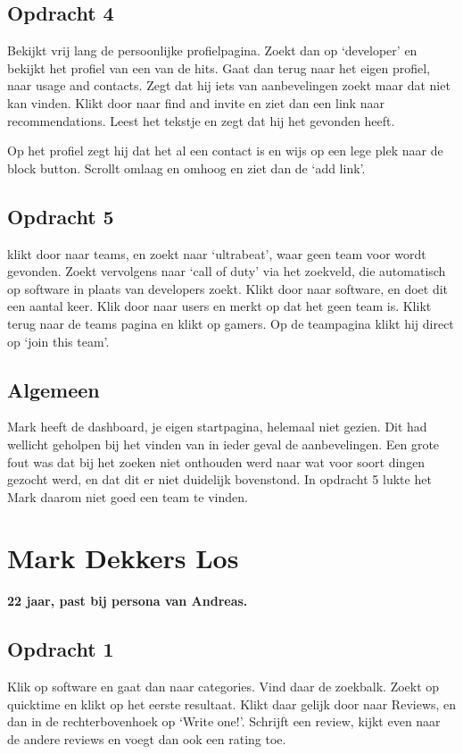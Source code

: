 \subsection{Opdracht 4}
Bekijkt vrij lang de persoonlijke profielpagina. Zoekt dan op `developer' en bekijkt het profiel van een van de hits. Gaat dan terug naar het eigen profiel, naar usage and contacts. Zegt dat hij iets van aanbevelingen zoekt maar dat niet kan vinden. Klikt door naar find and invite en ziet dan een link naar recommendations. Leest het tekstje en zegt dat hij het gevonden heeft.

Op het profiel zegt hij dat het al een contact is en wijs op een lege plek naar de block button. Scrollt omlaag en omhoog en ziet dan de `add link'.

\subsection{Opdracht 5}
klikt door naar teams, en zoekt naar `ultrabeat', waar geen team voor wordt gevonden. Zoekt vervolgens naar `call of duty' via het zoekveld, die automatisch op software in plaats van developers zoekt. Klikt door naar software, en doet dit een aantal keer. Klik door naar users en merkt op dat het geen team is. Klikt terug naar de teams pagina en klikt op gamers. Op de teampagina klikt hij direct op `join this team'.

\subsection{Algemeen}
Mark heeft de dashboard, je eigen startpagina, helemaal niet gezien. Dit had wellicht geholpen bij het vinden van in ieder geval de aanbevelingen. Een grote fout was dat bij het zoeken niet onthouden werd naar wat voor soort dingen gezocht werd, en dat dit er niet duidelijk bovenstond. In opdracht 5 lukte het Mark daarom niet goed een team te vinden.

\section{Mark Dekkers Los}
\textbf{22 jaar, past bij persona van Andreas.}

\subsection{Opdracht 1}
Klik op software en gaat dan naar categories. Vind daar de zoekbalk. Zoekt op quicktime en klikt op het eerste resultaat. Klikt daar gelijk door naar Reviews, en dan in de rechterbovenhoek op `Write one!'. Schrijft een review, kijkt even naar de andere reviews en voegt dan ook een rating toe.

